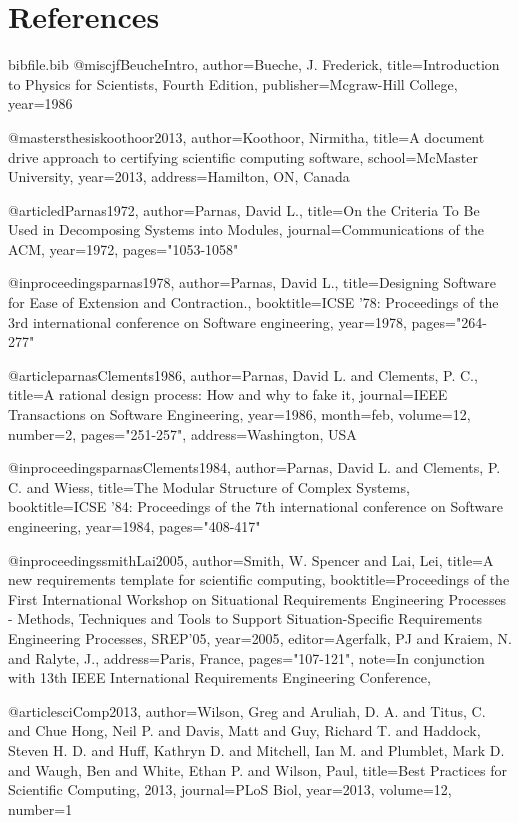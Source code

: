 \documentclass[12pt]{article}
\begin{document}
\section{References}
\label{Sec:References}
\begin{filecontents*}{bibfile.bib}
@misc{jfBeucheIntro,
author={Bueche, J. Frederick},
title={Introduction to Physics for Scientists, Fourth Edition},
publisher={Mcgraw-Hill College},
year={1986}}

@mastersthesis{koothoor2013,
author={Koothoor, Nirmitha},
title={A document drive approach to certifying scientific computing software},
school={McMaster University},
year={2013},
address={Hamilton, ON, Canada}}

@article{dParnas1972,
author={Parnas, David L.},
title={On the Criteria To Be Used in Decomposing Systems into Modules},
journal={Communications of the ACM},
year={1972},
pages={"1053-1058"}}

@inproceedings{parnas1978,
author={Parnas, David L.},
title={Designing Software for Ease of Extension and Contraction.},
booktitle={ICSE '78: Proceedings of the 3rd international conference on Software engineering},
year={1978},
pages={"264-277"}}

@article{parnasClements1986,
author={Parnas, David L. and Clements, P. C.},
title={A rational design process: How and why to fake it},
journal={IEEE Transactions on Software Engineering},
year={1986},
month=feb,
volume={12},
number={2},
pages={"251-257"},
address={Washington, USA}}

@inproceedings{parnasClements1984,
author={Parnas, David L. and Clements, P. C. and Wiess},
title={The Modular Structure of Complex Systems},
booktitle={ICSE '84: Proceedings of the 7th international conference on Software engineering},
year={1984},
pages={"408-417"}}

@inproceedings{smithLai2005,
author={Smith, W. Spencer and Lai, Lei},
title={A new requirements template for scientific computing},
booktitle={Proceedings of the First International Workshop on Situational Requirements Engineering Processes - Methods, Techniques and Tools to Support Situation-Specific Requirements Engineering Processes, SREP'05},
year={2005},
editor={Agerfalk, PJ and Kraiem, N. and Ralyte, J.},
address={Paris, France},
pages={"107-121"},
note={In conjunction with 13th IEEE International Requirements Engineering Conference,}}

@article{sciComp2013,
author={Wilson, Greg and Aruliah, D. A. and Titus, C. and Chue Hong, Neil P. and Davis, Matt and Guy, Richard T. and Haddock, Steven H. D. and Huff, Kathryn D. and Mitchell, Ian M. and Plumblet, Mark D. and Waugh, Ben and White, Ethan P. and Wilson, Paul},
title={Best Practices for Scientific Computing, 2013},
journal={PLoS Biol},
year={2013},
volume={12},
number={1}}
\end{filecontents*}
\nocite{*}
\printbibliography[heading=none]
\end{document}
